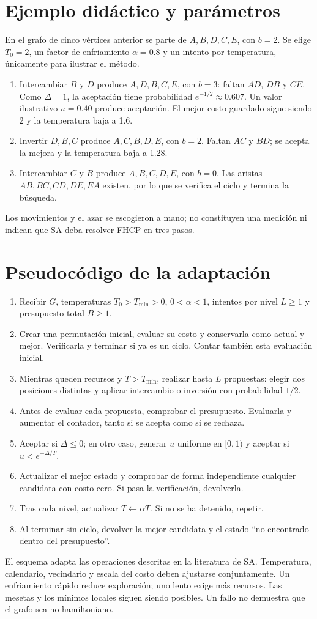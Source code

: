 \section{Ejemplo didáctico y parámetros}
En el grafo de cinco vértices anterior se parte de $A,B,D,C,E$, con $b=2$. Se elige $T_0=2$, un factor de enfriamiento $\alpha=0.8$ y un intento por temperatura, únicamente para ilustrar el método.
\begin{enumerate}
\item Intercambiar $B$ y $D$ produce $A,D,B,C,E$, con $b=3$: faltan $AD$, $DB$ y $CE$. Como $\Delta=1$, la aceptación tiene probabilidad $e^{-1/2}\approx0.607$. Un valor ilustrativo $u=0.40$ produce aceptación. El mejor costo guardado sigue siendo 2 y la temperatura baja a 1.6.
\item Invertir $D,B,C$ produce $A,C,B,D,E$, con $b=2$. Faltan $AC$ y $BD$; se acepta la mejora y la temperatura baja a 1.28.
\item Intercambiar $C$ y $B$ produce $A,B,C,D,E$, con $b=0$. Las aristas $AB,BC,CD,DE,EA$ existen, por lo que se verifica el ciclo y termina la búsqueda.
\end{enumerate}
Los movimientos y el azar se escogieron a mano; no constituyen una medición ni indican que SA deba resolver FHCP en tres pasos.

\section{Pseudocódigo de la adaptación}
\begin{enumerate}
\item Recibir $G$, temperaturas $T_0>T_{\min}>0$, $0<\alpha<1$, intentos por nivel $L\geq1$ y presupuesto total $B\geq1$.
\item Crear una permutación inicial, evaluar su costo y conservarla como actual y mejor. Verificarla y terminar si ya es un ciclo. Contar también esta evaluación inicial.
\item Mientras queden recursos y $T>T_{\min}$, realizar hasta $L$ propuestas: elegir dos posiciones distintas y aplicar intercambio o inversión con probabilidad $1/2$.
\item Antes de evaluar cada propuesta, comprobar el presupuesto. Evaluarla y aumentar el contador, tanto si se acepta como si se rechaza.
\item Aceptar si $\Delta\leq0$; en otro caso, generar $u$ uniforme en $[0,1)$ y aceptar si $u<e^{-\Delta/T}$.
\item Actualizar el mejor estado y comprobar de forma independiente cualquier candidata con costo cero. Si pasa la verificación, devolverla.
\item Tras cada nivel, actualizar $T\leftarrow\alpha T$. Si no se ha detenido, repetir.
\item Al terminar sin ciclo, devolver la mejor candidata y el estado ``no encontrado dentro del presupuesto''.
\end{enumerate}
El esquema adapta las operaciones descritas en la literatura de SA.\cite{sa4,sa7} Temperatura, calendario, vecindario y escala del costo deben ajustarse conjuntamente. Un enfriamiento rápido reduce exploración; uno lento exige más recursos. Las mesetas y los mínimos locales siguen siendo posibles. Un fallo no demuestra que el grafo sea no hamiltoniano.
